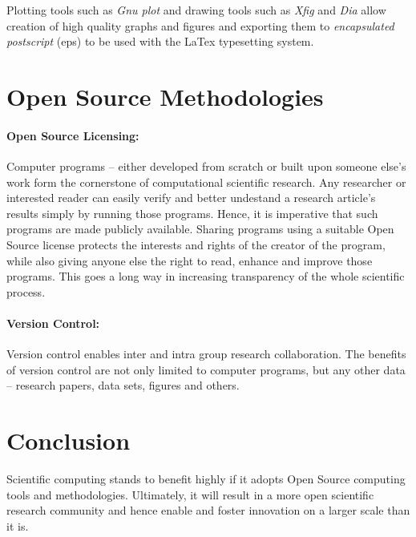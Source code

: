 \documentclass[ifip]{svmult}
\begin{document}
Plotting tools such as \textit{Gnu plot} and drawing tools such as
\textit{Xfig} and \textit{Dia} allow creation of high quality graphs
and figures and exporting them to \textit{encapsulated postscript}
(eps) to be used with the LaTex typesetting system.


\section{Open Source Methodologies}

\paragraph{Open Source Licensing:}

Computer programs -- either developed from scratch or built upon someone
else's work form the cornerstone of computational scientific
research. Any researcher or interested reader can easily verify and
better undestand a research article's results simply by running those
programs. Hence, it is imperative that such programs are made publicly
available. Sharing programs using a suitable Open Source license
protects the interests and rights of the creator of the program, while
also giving anyone else the right to read, enhance and improve those
programs. This goes a long way in increasing transparency of the whole
scientific process.

\paragraph{Version Control:}

Version control enables inter and intra group research
collaboration. The benefits of version control are not only limited to
computer programs, but any other data -- research papers, data sets,
figures and others. 

\section{Conclusion}

Scientific computing stands to benefit highly if it adopts Open Source
computing tools and methodologies. Ultimately, it will result in a
more open scientific research community and hence enable and foster innovation on
a larger scale than it is.
\end{document}
